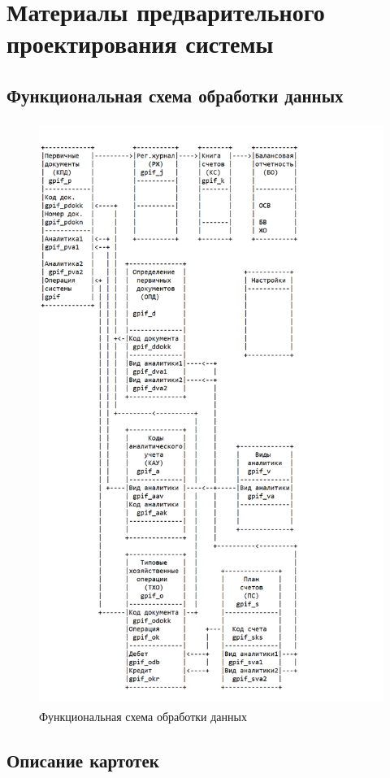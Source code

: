 \section{Материалы предварительного проектирования системы}
\subsection{Функциональная схема обработки данных}

\begin{figure}[!htb]
    \centering
    \includegraphics[height=19cm]
        {_assets/gpif_part2.png}
    \caption{Функциональная схема обработки данных}
\end{figure}

\subsection{Описание картотек}

